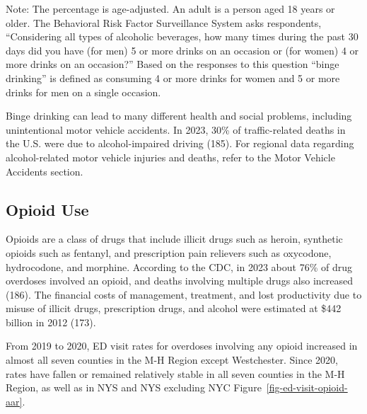 \documentclass[
  english,
  letterpaper,
]{report}
\begin{document}
\begin{tcolorbox}[enhanced jigsaw, breakable, leftrule=.75mm, title=\textcolor{quarto-callout-note-color}{\faInfo}\hspace{0.5em}{Note}, bottomrule=.15mm, opacityback=0, left=2mm, colback=white, bottomtitle=1mm, coltitle=black, colbacktitle=quarto-callout-note-color!10!white, colframe=quarto-callout-note-color-frame, opacitybacktitle=0.6, toptitle=1mm, titlerule=0mm, arc=.35mm, rightrule=.15mm, toprule=.15mm]

Note: The percentage is age-adjusted. An adult is a person aged 18 years
or older. The Behavioral Risk Factor Surveillance System asks
respondents, ``Considering all types of alcoholic beverages, how many
times during the past 30 days did you have (for men) 5 or more drinks on
an occasion or (for women) 4 or more drinks on an occasion?'' Based on
the responses to this question ``binge drinking'' is defined as
consuming 4 or more drinks for women and 5 or more drinks for men on a
single occasion.

\end{tcolorbox}

Binge drinking can lead to many different health and social problems,
including unintentional motor vehicle accidents. In 2023, 30\% of
traffic-related deaths in the U.S. were due to alcohol-impaired driving
(185). For regional data regarding alcohol-related motor vehicle
injuries and deaths, refer to the Motor Vehicle Accidents section.

\subsection{Opioid Use}\label{opioid-use}

Opioids are a class of drugs that include illicit drugs such as heroin,
synthetic opioids such as fentanyl, and prescription pain relievers such
as oxycodone, hydrocodone, and morphine. According to the CDC, in 2023
about 76\% of drug overdoses involved an opioid, and deaths involving
multiple drugs also increased (186). The financial costs of management,
treatment, and lost productivity due to misuse of illicit drugs,
prescription drugs, and alcohol were estimated at \$442 billion in 2012
(173).

From 2019 to 2020, ED visit rates for overdoses involving any opioid
increased in almost all seven counties in the M-H Region except
Westchester. Since 2020, rates have fallen or remained relatively stable
in all seven counties in the M-H Region, as well as in NYS and NYS
excluding NYC Figure~\ref{fig-ed-visit-opioid-aar}.
\end{document}
